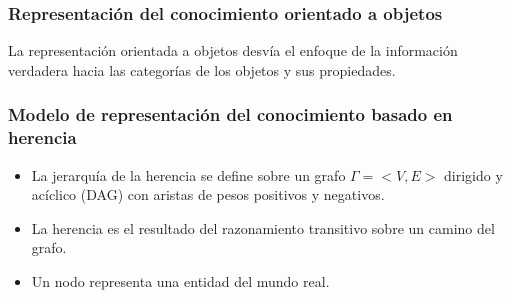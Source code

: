 \documentclass[
10pt, %
aspectratio=169, %
]{beamer}
\begin{document}
	\begin{frame}
		
		\frametitle{Representación del conocimiento orientado a objetos }
		
		La representación orientada a objetos desvía el enfoque de la información verdadera hacia las categorías de los objetos y sus propiedades.
		
	\end{frame}
	
	\begin{frame}
		
		\frametitle{Modelo de representación del conocimiento basado en herencia}
		
		\begin{itemize}
			\item La jerarquía de la herencia se define sobre un grafo $\Gamma = <V, E>$ dirigido y acíclico (DAG) con aristas de pesos positivos y negativos. 
			
			\vspace{1\baselineskip}
			\item La herencia es el resultado del razonamiento transitivo sobre un camino del grafo.
			
			\vspace{1\baselineskip}
			\item Un nodo representa una entidad del mundo real.
		\end{itemize}
		
	\end{frame}
	
\end{document}
